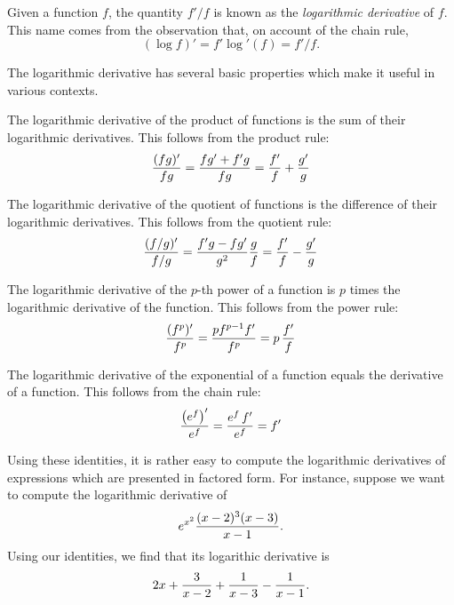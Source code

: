 \documentclass[12pt]{article}
\begin{document}
Given a function $f$, the quantity $f'/f$ is known as the
\emph{logarithmic derivative} of $f$.  This name comes 
from the observation that, on account of the chain 
rule, 
\[
(\log f)' = f' \log' (f) = f'/f.
\]

The logarithmic derivative has several basic properties
which make it useful in various contexts.

The logarithmic derivative of the product of
functions is the sum of their logarithmic
derivatives.  This follows from the product rule:
$$
{(fg)' \over fg} =
{fg' + f'g \over fg} = 
{f' \over f} + {g' \over g}
$$

The logarithmic derivative of the quotient of
functions is the difference of their logarithmic
derivatives.  This follows from the quotient rule:
\[
{(f/g)' \over f/g} =
{f'g - fg' \over g^2} {g \over f} =
{f' \over f} - {g' \over g}
\]

The logarithmic derivative of the $p$-th power
of a function is $p$ times the logarithmic
derivative of the function.  This follows
from the power rule:
\[
{(f^p)' \over f^p} =
{p f^{p-1} f' \over f^p} =
p \, {f' \over f}
\]

The logarithmic derivative of the exponential 
of a function equals the derivative of a 
function.  This follows from the chain rule:
\[
{\left( e^f \right)' \over e^f} =
{e^f \, f' \over e^f} = f'
\]

Using these identities, it is rather easy to 
compute the logarithmic derivatives of expressions
which are presented in factored form.  For instance,
suppose we want to compute the logarithmic derivative
of 
\[
e^{x^2} { (x-2)^3 (x-3) \over x - 1}.
\]
Using our identities, we find that its logarithic 
derivative is
\[
2x + {3 \over x-2} + {1 \over x-3} - {1 \over x-1}.
\]
\end{document}
